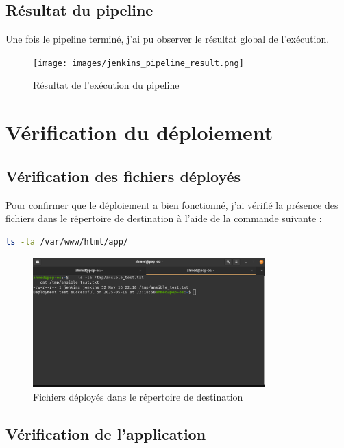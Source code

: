 \documentclass{article}
\begin{document}
\subsection{Résultat du pipeline}

Une fois le pipeline terminé, j'ai pu observer le résultat global de l'exécution.

\begin{figure}[h]
    \centering
    \texttt{[image: images/jenkins\_pipeline\_result.png]}
    \caption{Résultat de l'exécution du pipeline}
    \label{fig:jenkins_pipeline_result}
\end{figure}

\section{Vérification du déploiement}
\subsection{Vérification des fichiers déployés}

Pour confirmer que le déploiement a bien fonctionné, j'ai vérifié la présence des fichiers dans le répertoire de destination à l'aide de la commande suivante :

\begin{lstlisting}[language=bash]
ls -la /var/www/html/app/
\end{lstlisting}

\begin{figure}[h]
    \centering
    \includegraphics[width=0.8\textwidth]{images/deployed_files.png}
    \caption{Fichiers déployés dans le répertoire de destination}
    \label{fig:deployed_files}
\end{figure}

\subsection{Vérification de l'application}
\end{document}
